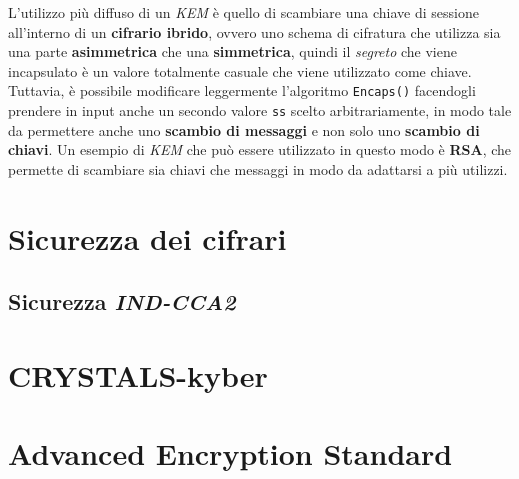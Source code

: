 L'utilizzo più diffuso di un \emph{KEM} è quello di scambiare una chiave di sessione all'interno di un \textbf{cifrario ibrido}, ovvero uno schema di cifratura che utilizza sia una parte \textbf{asimmetrica} che una \textbf{simmetrica}, quindi il \emph{segreto} che viene incapsulato è un valore totalmente casuale che viene utilizzato come chiave. Tuttavia, è possibile modificare leggermente l'algoritmo \texttt{Encaps()} facendogli prendere in input anche un secondo valore \texttt{ss} scelto arbitrariamente, in modo tale da permettere anche uno \textbf{scambio di messaggi} e non solo uno \textbf{scambio di chiavi}. Un esempio di \emph{KEM} che può essere utilizzato in questo modo è \textbf{RSA}, che permette di scambiare sia chiavi che messaggi in modo da adattarsi a più utilizzi. \cite{wikipedia_kem}

\section{Sicurezza dei cifrari}
\subsection{Sicurezza \emph{IND-CCA2}}

\section{CRYSTALS-kyber}


\section{Advanced Encryption Standard}

\newpage